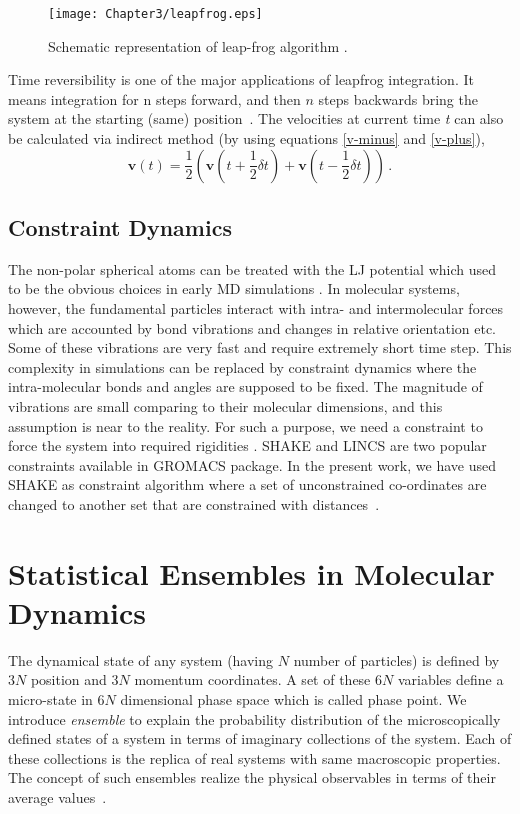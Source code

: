 \begin{figure}[h!]
\centering
\texttt{[image: Chapter3/leapfrog.eps]}
\caption[Schematic representation of leap-frog algorithm. ]{Schematic representation of leap-frog algorithm \citep{Frenkel2002}.}
\label{leap_frog}
\end{figure}
Time reversibility is one of the major applications of leapfrog integration. It means integration for n steps forward, and then $n$ steps backwards bring the system at the starting (same) position~\citep{Allen1989}. 
The velocities at current time {\it t} can also be calculated via indirect method (by using equations \ref{v-minus} and \ref{v-plus}), 
\begin{equation}
\textbf{v}(t) = \frac{1}{2} \left(\textbf{v}\left(t + \frac{1}{2} \delta t\right) + \textbf{v} \left(t - \frac{1}{2} \delta t\right)\right)\,.
\end{equation}
\subsection{Constraint Dynamics}
The non-polar spherical atoms can be treated with the LJ potential which used to be the obvious choices in early 
MD simulations \citep{Harp1968, Harp1970}. In molecular systems, however, the fundamental particles interact with intra- and intermolecular forces which are accounted by bond vibrations and changes in relative orientation etc. Some of these vibrations are very fast and require extremely short time step. This complexity in simulations can be replaced by constraint dynamics where the intra-molecular bonds and angles are supposed to be fixed. The magnitude of vibrations are small comparing to their molecular dimensions, and this assumption is near to the reality. For such a purpose, we need a constraint to force the system into required rigidities \citep{Leach2001}. SHAKE and LINCS are two popular constraints available in GROMACS package.  In the present work, we have used SHAKE as constraint algorithm where a set of unconstrained co-ordinates are changed to another set that are constrained with distances~\citep{Gromacs-manual}.
\section{ Statistical Ensembles in Molecular Dynamics}
The dynamical state of any system (having $N$ number of particles) is defined by $3N$ position and $3N$ momentum coordinates. A set of these $6N$ variables define a micro-state in $6N$ dimensional phase space which is called phase point. We introduce {\it ensemble} to explain the probability distribution of the microscopically defined states of a system in terms of imaginary collections of the system. Each of these collections is the replica of real systems with same macroscopic properties. The concept of such ensembles realize the physical observables in terms of their average values~\citep{Pathria1996}.

